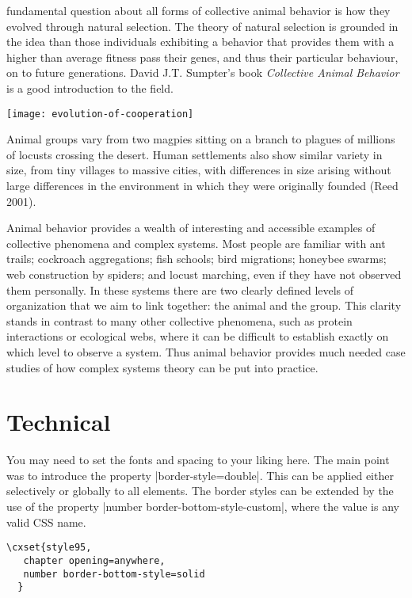  fundamental question about all forms of  collective animal behavior is how they evolved through natural selection.  The theory of natural selection is grounded in the idea than those individuals exhibiting a behavior that provides them with a higher than average fitness pass their genes, and thus their particular behaviour, on to future generations.  David J.T. Sumpter’s book \emph{Collective Animal Behavior} is a good introduction to the field.  


{%
\centering
\texttt{[image: evolution-of-cooperation]}
}

Animal groups vary from two magpies sitting on a branch to plagues of millions of locusts crossing the desert. 
Human settlements also show similar variety in size, from tiny villages to massive cities, with differences in size arising without large differences in the environment in which they were originally founded (Reed 2001).

Animal behavior provides a wealth of interesting and accessible examples
of collective phenomena and complex systems. Most people are
familiar with ant trails; cockroach aggregations; fish schools; bird migrations;
honeybee swarms; web construction by spiders; and locust marching,
even if they have not observed them personally. In these systems
there are two clearly defined levels of organization that we aim to link
together: the animal and the group. This clarity stands in contrast to
many other collective phenomena, such as protein interactions or ecological
webs, where it can be difficult to establish exactly on which level
to observe a system. Thus animal behavior provides much needed case
studies of how complex systems theory can be put into practice. 

\section{Technical}

You may need to set the fonts and spacing to your liking here. The main point was to introduce the property
|border-style=double|. This can be applied either selectively or globally to all elements. The border styles can be extended by the use of the property |number border-bottom-style-custom|, where the value is 
any valid CSS name. 


\example
\begin{verbatim}
\cxset{style95,
   chapter opening=anywhere,
   number border-bottom-style=solid
  }
\end{verbatim}


